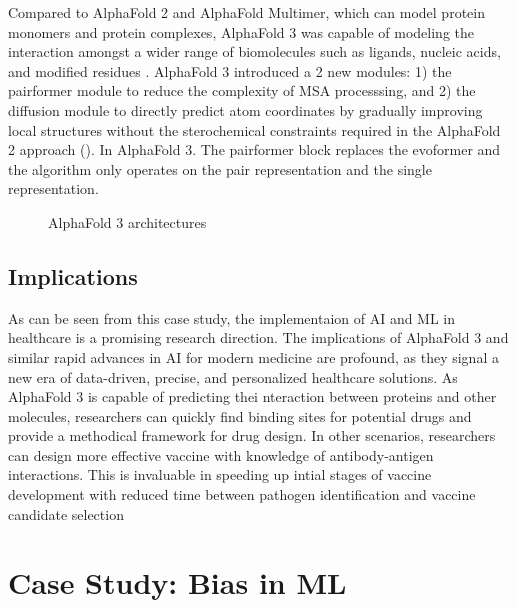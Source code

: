\documentclass[a4paper]{article}
\begin{document}
Compared to AlphaFold 2 and AlphaFold Multimer, which can model protein monomers and protein complexes, AlphaFold 3 was capable of modeling the interaction amongst a wider range of biomolecules such as ligands, nucleic acids, and modified residues \cite{abramson_accurate_2024}. AlphaFold 3 introduced a  2 new modules: 1) the pairformer module to reduce the complexity of MSA processsing, and 2) the diffusion module to directly predict atom coordinates by gradually improving local structures without the sterochemical constraints required in the AlphaFold 2 approach (). In AlphaFold 3. 
The pairformer block replaces the evoformer and the algorithm only operates on the pair representation and the single representation.

\begin{figure}[h]
    \caption{AlphaFold 3 architectures} 
    \label{fig:AlphaFold3_Architecture}
\end{figure}

\subsection{Implications}
As can be seen from this case study, the implementaion of AI and ML in healthcare is a promising research direction. The implications of AlphaFold 3 and similar rapid advances in AI for modern medicine are profound, as they signal a new era of data-driven, precise, and personalized healthcare solutions. As AlphaFold 3 is capable of predicting thei nteraction between proteins and other molecules, researchers can quickly find binding sites for potential drugs and provide a methodical framework for drug design. In other scenarios, researchers can design more effective vaccine with knowledge of antibody-antigen interactions. This is invaluable in speeding up intial stages of vaccine development with reduced time between pathogen identification and vaccine candidate selection  




\section{Case Study: Bias in ML}
\end{document}
